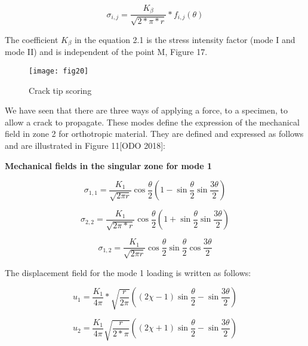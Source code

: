 \begin{equation}
	\sigma_{i,j} = \frac{K_{\beta}}{\sqrt{2*\pi*r}}*f_{i,j}(\theta)
\end{equation}

The coefficient $K_\beta$ in the equation 2.1 is the stress intensity factor (mode I and mode II) and is independent of the point M, Figure 17.

\graphicspath{{Images/}}
\begin{figure}[htp]
	\centering
	\texttt{[image: fig20]}
	\caption{Crack tip scoring}
	\label{fig:galaxy}
\end{figure}

We have seen that there are three ways of applying a force, to a specimen, to allow a crack to propagate. These modes define the expression of the mechanical field in zone 2 for orthotropic material. They are defined and expressed as follows and are illustrated in Figure 11[ODO 2018]:

\textbf{Mechanical fields in the singular zone for mode 1}

\begin{equation}
	\sigma_{1,1} = \frac{K_{1}}{\sqrt{2 \pi r}} \cos{\frac{\theta}{2}}  \left( 1-\sin{\frac{\theta}{2}} \sin{\frac{3 \theta}{2}} \right)
\end{equation}

\begin{equation}
	\sigma_{2,2} = \frac{K_{1}}{\sqrt{2 \pi*r}} \cos{\frac{\theta}{2}}  \left( 1+\sin{\frac{\theta}{2}} \sin{\frac{3 \theta}{2}} \right)
\end{equation}

\begin{equation}
	\sigma_{1,2} = \frac{K_{1}}{\sqrt{2 \pi r}} \cos{\frac{\theta}{2}}  \sin{\frac{\theta}{2}} \cos{\frac{3 \theta}{2}}
\end{equation}

The displacement field for the mode 1 loading is written as follows:

\begin{equation}
	u_{1} = \frac{K_{1}}{4 \pi}*\sqrt{\frac{r}{2 \pi}} \left((2 \chi-1) \sin{\frac{\theta}{2}}-\sin{\frac{3 \theta}{2}}\right)
\end{equation}

\begin{equation}
	u_{2} = \frac{K_{1}}{4 \pi} \sqrt{\frac{r}{2*\pi}} \left((2 \chi+1) \sin{\frac{\theta}{2}}-\sin{\frac{3 \theta}{2}}\right)
\end{equation}

